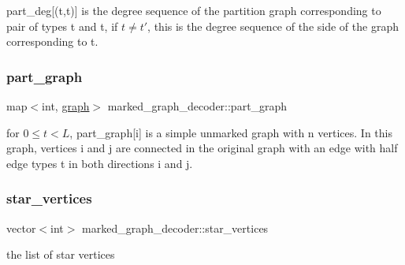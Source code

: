 part\+\_\+deg\mbox{[}(t,t\textquotesingle{})\mbox{]} is the degree sequence of the partition graph corresponding to pair of types t and t\textquotesingle{}, if $t \neq t'$, this is the degree sequence of the side of the graph corresponding to t. 

\mbox{\label{classmarked__graph__decoder_a7c4e5c397ad8adf0168f44d695857403}} 
\subsubsection{\texorpdfstring{part\+\_\+graph}{part\_graph}}
{\footnotesize\ttfamily map$<$int, \hyperlink{classgraph}{graph}$>$ marked\+\_\+graph\+\_\+decoder\+::part\+\_\+graph\hspace{0.3cm}{\ttfamily [private]}}



for $0 \leq t < L$, part\+\_\+graph\mbox{[}i\mbox{]} is a simple unmarked graph with n vertices. In this graph, vertices i and j are connected in the original graph with an edge with half edge types t in both directions i and j. 

\mbox{\label{classmarked__graph__decoder_a06fc05827db14b675f7ecc2fd915b533}} 
\subsubsection{\texorpdfstring{star\+\_\+vertices}{star\_vertices}}
{\footnotesize\ttfamily vector$<$int$>$ marked\+\_\+graph\+\_\+decoder\+::star\+\_\+vertices\hspace{0.3cm}{\ttfamily [private]}}



the list of star vertices 

\mbox{\label{classmarked__graph__decoder_a98be932a5abff7efbc8dd4290268b69a}} 
